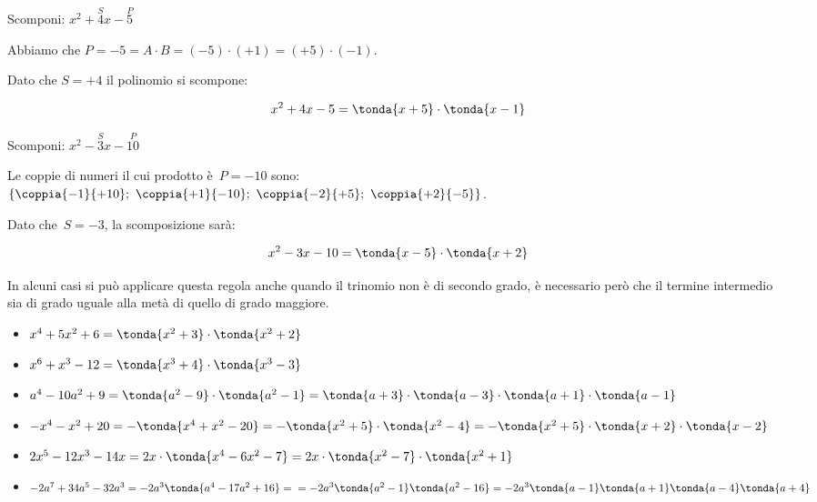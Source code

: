 
\begin{esempio}{}{}
Scomponi: \(x^2+\overset{S}{4}x-\overset{P}{5}\)

Abbiamo che \(P = -5 = A \cdot B = (-5) \cdot (+1) = (+5) \cdot (-1)\).

Dato che \(S = +4\) il polinomio si scompone:

\vspace{-1.0em}
\[x^2+4x-5=\tonda{x+5}\cdot \tonda{x-1}\]
\end{esempio}

\begin{esempio}{}{}
Scomponi: \(x^2-\overset{S}{3}x-\overset{P}{10}\)

Le coppie di numeri il cui prodotto è~\(P=-10\) sono:\\ 
\(\{\coppia{-1}{+10};~\coppia{+1}{-10};~\coppia{-2}{+5};~\coppia{+2}{-5}
\}\).

Dato che~\(S=-3\), la scomposizione sarà:

\vspace{-1.0em}
\[x^2-3x-10=\tonda{x-5}\cdot \tonda{x+2}\]
\end{esempio}

\begin{esempio}{}{}
In alcuni casi si può applicare questa regola anche quando il trinomio
non è di secondo grado, è necessario però che il termine 
intermedio sia di grado uguale alla metà di quello di grado maggiore.

\begin{itemize}[nosep]
\item \(x^4+5x^2+6=\tonda{x^2+3}\cdot \tonda{x^2+2}\)
\item \(x^6+x^3-12=\tonda{x^3+4}\cdot \tonda{x^3-3}\)
\item \(a^{4}-10a^{2}+9=\tonda{a^{2}-9}\cdot\tonda{a^{2}-1}=
       \tonda{a+3}\cdot \tonda{a-3}\cdot 
       \tonda{a+1}\cdot\tonda{a-1}\)
\item \(-x^4-x^2+20=-\tonda{x^4+x^2-20}=
       -\tonda{x^2+5}\cdot\tonda{x^2-4}=
       -\tonda{x^2+5}\cdot\tonda{x+2}\cdot \tonda{x-2}\)
\item \(2x^{5}-12x^3-14x=2x\cdot \tonda{x^4-6x^2-7}=2x\cdot%
\tonda{x^2-7}\cdot \tonda{x^2+1}\)
\item \(-2a^{7}+34a^{5}-32a^{3}=-2a^{3}\tonda{a^{4}-17a^{2}+16}=\\
    =-2a^{3}\tonda{a^{2}-1}\tonda{a^{2}-16}
=-2a^{3}\tonda{a-1}\tonda{a+1}\tonda{a-4}\tonda{a+4}\)
\end{itemize}
\end{esempio}


